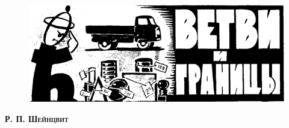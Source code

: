 

\pagestyle{fancy}
\fancyfoot{}
\fancyfoot[LO,RE]{\thepage}
\begin{figure}
    \includegraphics[width=1\linewidth]{Снимок экрана 2023-11-23 в 20.34.57.png}
\end{figure}
\begin{flushright}
    \Large{\textsc{\textbf{Р. П. Шейнцвит}}}
\end{flushright}

